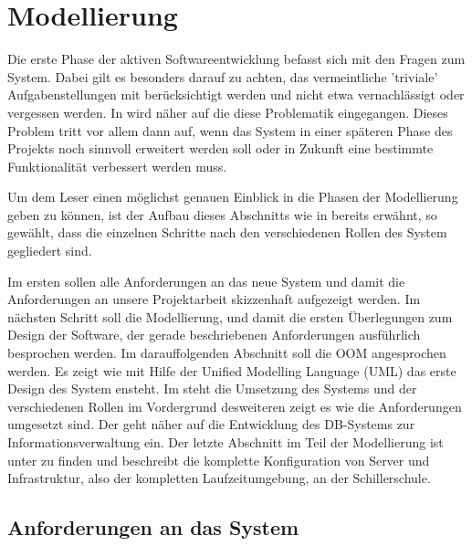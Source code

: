 \section{Modellierung}\label{sec:Modellierung}

Die erste Phase der aktiven Softwareentwicklung befasst sich mit den Fragen zum System. Dabei gilt es besonders darauf zu achten, das vermeintliche 'triviale' Aufgabenstellungen mit berücksichtigt werden und nicht etwa vernachlässigt oder vergessen werden.  In  wird näher auf die diese Problematik eingegangen. Dieses Problem tritt vor allem dann auf, wenn das System in einer späteren Phase des Projekts noch sinnvoll erweitert werden soll oder in Zukunft eine bestimmte Funktionalität verbessert werden muss.

Um dem Leser einen möglichst genauen Einblick in die Phasen der Modellierung geben zu können, ist der Aufbau dieses Abschnitts wie in  bereits erwähnt, so gewählt, dass die einzelnen Schritte nach den verschiedenen Rollen des System gegliedert sind.

Im ersten  sollen alle Anforderungen an das neue System und damit die Anforderungen an unsere Projektarbeit skizzenhaft aufgezeigt werden.
Im nächsten Schritt soll die Modellierung, und damit die ersten Überlegungen zum Design der Software, der gerade beschriebenen Anforderungen ausführlich besprochen werden.
Im darauffolgenden Abschnitt soll die \ac{OOM} angesprochen werden. Es zeigt wie mit Hilfe der \gls{Unified Modelling Language} (UML) das erste Design des System ensteht.  
Im  steht die Umsetzung des Systems und der verschiedenen Rollen im Vordergrund desweiteren zeigt es wie die Anforderungen umgesetzt sind.
Der  geht näher auf die Entwicklung des \ac{DB}-Systems zur Informationsverwaltung ein.
Der letzte Abschnitt im Teil der Modellierung ist unter  zu finden und beschreibt die komplette Konfiguration von Server und Infrastruktur, also der kompletten Laufzeitumgebung, an der Schillerschule. 

\subsection{Anforderungen an das System}\label{subsec:Anforderungen an das System}

